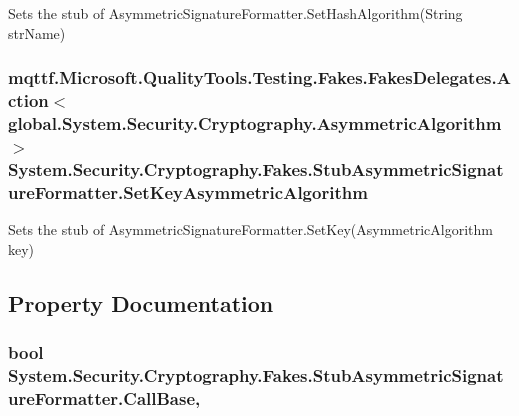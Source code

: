 Sets the stub of Asymmetric\-Signature\-Formatter.\-Set\-Hash\-Algorithm(\-String str\-Name)

\hypertarget{class_system_1_1_security_1_1_cryptography_1_1_fakes_1_1_stub_asymmetric_signature_formatter_aec9e454bed744850ce7767ddace03d63}{
\subsubsection[{Set\-Key\-Asymmetric\-Algorithm}]{\setlength{\rightskip}{0pt plus 5cm}mqttf.\-Microsoft.\-Quality\-Tools.\-Testing.\-Fakes.\-Fakes\-Delegates.\-Action$<$global.\-System.\-Security.\-Cryptography.\-Asymmetric\-Algorithm$>$ System.\-Security.\-Cryptography.\-Fakes.\-Stub\-Asymmetric\-Signature\-Formatter.\-Set\-Key\-Asymmetric\-Algorithm}}\label{class_system_1_1_security_1_1_cryptography_1_1_fakes_1_1_stub_asymmetric_signature_formatter_aec9e454bed744850ce7767ddace03d63}


Sets the stub of Asymmetric\-Signature\-Formatter.\-Set\-Key(\-Asymmetric\-Algorithm key)



\subsection{Property Documentation}
\hypertarget{class_system_1_1_security_1_1_cryptography_1_1_fakes_1_1_stub_asymmetric_signature_formatter_adbbc0d9bd313b9e93ae4636dfee09746}{
\subsubsection[{Call\-Base}]{\setlength{\rightskip}{0pt plus 5cm}bool System.\-Security.\-Cryptography.\-Fakes.\-Stub\-Asymmetric\-Signature\-Formatter.\-Call\-Base\hspace{0.3cm}{\ttfamily [get]}, {\ttfamily [set]}}}\label{class_system_1_1_security_1_1_cryptography_1_1_fakes_1_1_stub_asymmetric_signature_formatter_adbbc0d9bd313b9e93ae4636dfee09746}


